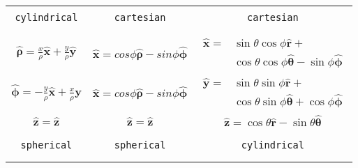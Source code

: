 \documentclass[letterpaper,landscape,10pt]{article}
\begin{document}
{\begin{multicols}{3}
\begin{center}
\begin{tabular}{ c c c }
		\vspace{.5pt}\\
		\hline
		\vspace{.5pt}\\
		\texttt{cylindrical}    & \texttt{cartesian} & \texttt{cartesian} \\
		\vspace{.5pt}\\
		\hline
		\vspace{.5pt}\\

		$ \bm{\hat{\rho}} = \frac{x}{\rho}\bm{\hat{x}} +
				\frac{y}{\rho}\bm{\hat{y}} $ &
		$ \bm{\hat{x}} = cos\phi\bm{\hat{\rho}} - sin\phi\bm{\hat{\phi}} $ &
		\vspace{-8pt}
		\parbox[t]{.9in}{\vspace{-15pt}
			\begin{equation*}\begin{split}
				\bm{\hat{x}} =&
					\sin\theta\cos\phi\bm{\hat{r}} + \\
					&{\cos\theta\cos\phi\bm{\hat{\theta}} - 
					\sin\phi\bm{\hat{\phi}}}
			\end{split}\end{equation*} } \\

		$ \bm{\hat{\phi}} = -\frac{y}{\rho}\bm{\hat{x}} + 
			\frac{x}{\rho}\bm{\hat{y}} $ &
		$ \bm{\hat{x}}=cos\phi\bm{\hat{\rho}}-sin\phi\bm{\hat{\phi}} $ &
		\vspace{-8pt}
		\parbox[t]{.9in}{\vspace{-15pt}
			\begin{equation*}\begin{split}
				\bm{\hat{y}} =& \sin\theta\sin\phi\bm{\hat{r}} + \\
					&\cos\theta\sin\phi\bm{\hat{\theta}} +
					\cos\phi\bm{\hat{\phi}}
				\end{split}\end{equation*} } \\

		$ \bm{\hat{z}} = \bm{\hat{z}} $ &
		$ \bm{\hat{z}} = \bm{\hat{z}} $ &
		$ \bm{\hat{z}} = \cos\theta\bm{\hat{r}}-\sin\theta\bm{\hat{\theta}} $\\

		\vspace{.5pt}\\
		\hline
		\vspace{.5pt}\\
		\texttt{spherical}      & \texttt{spherical} & \texttt{cylindrical} \\
		\vspace{.5pt}\\
		\hline
		\vspace{.5pt}\\


\end{tabular}
\end{center}
\end{multicols}}
\end{document}
